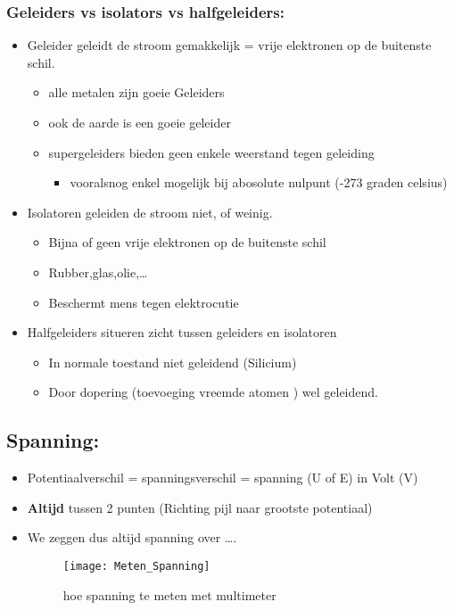 \documentclass[12pt]{article}
\begin{document}
\subsubsection{\textbf{Geleiders vs isolators vs halfgeleiders:}}
\begin{itemize}
    \item Geleider geleidt de stroom gemakkelijk = vrije elektronen op de buitenste schil.\begin{itemize}
        \item alle metalen zijn goeie Geleiders
        \item ook de aarde is een goeie geleider
        \item supergeleiders bieden geen enkele weerstand tegen geleiding\begin{itemize}
            \item vooralsnog enkel mogelijk bij abosolute nulpunt (-273 graden celsius)
        \end{itemize}
    \end{itemize}
    \item Isolatoren geleiden de stroom niet, of weinig.\begin{itemize}
        \item Bijna of geen vrije elektronen op de buitenste schil 
        \item Rubber,glas,olie,\dots
        \item Beschermt mens tegen elektrocutie
    \end{itemize}
    \item Halfgeleiders situeren zicht tussen geleiders en isolatoren\begin{itemize}
        \item In normale toestand niet geleidend (Silicium)
        \item Door dopering (toevoeging vreemde atomen ) wel geleidend.
    \end{itemize} 
\end{itemize}
\subsection{Spanning:}
\begin{itemize}
    \item Potentiaalverschil = spanningsverschil = spanning (U of E) in Volt (V)
    \item \textbf{Altijd} tussen 2 punten (Richting pijl naar grootste potentiaal)
    \item We zeggen dus altijd spanning over \dots .
    \begin{figure}[ht]
        \centering
        \texttt{[image: Meten\_Spanning]}
    \caption{hoe spanning te meten met multimeter}
    \end{figure}
\end{itemize}
\end{document}
